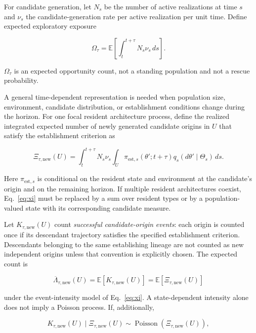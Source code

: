 \documentclass[11pt,a4paper]{article}
\begin{document}
For candidate generation, let $N_s$ be the number of active realizations at time $s$ and $\nu_s$ the candidate-generation rate per active realization per unit time. Define expected exploratory exposure

\begin{equation}
\boxed{
\Omega_\tau
=
\mathbb E\!\left[
\int_t^{t+\tau}N_s\nu_s\,ds
\right].
}
\label{eq:omega}
\end{equation}

$\Omega_\tau$ is an expected opportunity count, not a standing population and not a rescue probability.

A general time-dependent representation is needed when population size, environment, candidate distribution, or establishment conditions change during the horizon. For one focal resident architecture process, define the realized integrated expected number of newly generated candidate origins in $U$ that satisfy the establishment criterion as

\begin{equation}
\Xi_{\tau,\mathrm{new}}(U)
=
\int_t^{t+\tau}
N_s\nu_s
\int_U
\pi_{\mathrm{est},s}(\theta';t+\tau)
q_s(d\theta'\mid\Theta_s)
\,ds.
\label{eq:xi}
\end{equation}

Here $\pi_{\mathrm{est},s}$ is conditional on the resident state and environment at the candidate's origin and on the remaining horizon. If multiple resident architectures coexist, Eq.~\eqref{eq:xi} must be replaced by a sum over resident types or by a population-valued state with its corresponding candidate measure.

Let $K_{\tau,\mathrm{new}}(U)$ count \emph{successful candidate-origin events}: each origin is counted once if its descendant trajectory satisfies the specified establishment criterion. Descendants belonging to the same establishing lineage are not counted as new independent origins unless that convention is explicitly chosen. The expected count is

\begin{equation}
\overline\Lambda_{\tau,\mathrm{new}}(U)
=
\mathbb E[K_{\tau,\mathrm{new}}(U)]
=
\mathbb E[\Xi_{\tau,\mathrm{new}}(U)]
\label{eq:expected-success-count}
\end{equation}

under the event-intensity model of Eq.~\eqref{eq:xi}. A state-dependent intensity alone does not imply a Poisson process. If, additionally,

\begin{equation}
K_{\tau,\mathrm{new}}(U)\mid\Xi_{\tau,\mathrm{new}}(U)
\sim
\operatorname{Poisson}\!\left(\Xi_{\tau,\mathrm{new}}(U)\right),
\label{eq:conditional-poisson}
\end{equation}
\end{document}
